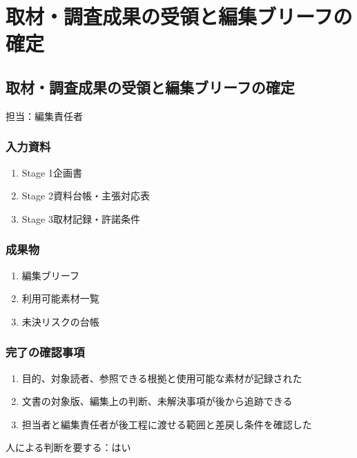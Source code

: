 \documentclass[a4paper,11pt]{article}
\begin{document}
\section{取材・調査成果の受領と編集ブリーフの確定}
\subsection{取材・調査成果の受領と編集ブリーフの確定}
\par 担当：編集責任者\par\medskip
\subsubsection*{入力資料}
\begin{enumerate}[leftmargin=2em,itemsep=0.35em]
\item Stage 1企画書
\item Stage 2資料台帳・主張対応表
\item Stage 3取材記録・許諾条件
\end{enumerate}
\subsubsection*{成果物}
\begin{enumerate}[leftmargin=2em,itemsep=0.35em]
\item 編集ブリーフ
\item 利用可能素材一覧
\item 未決リスクの台帳
\end{enumerate}
\subsubsection*{完了の確認事項}
\begin{enumerate}[leftmargin=2em,itemsep=0.35em]
\item 目的、対象読者、参照できる根拠と使用可能な素材が記録された
\item 文書の対象版、編集上の判断、未解決事項が後から追跡できる
\item 担当者と編集責任者が後工程に渡せる範囲と差戻し条件を確認した
\end{enumerate}
\par 人による判断を要する：はい\par\medskip
\end{document}
